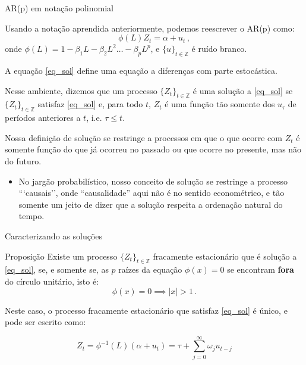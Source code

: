 \documentclass[11pt]{beamer}
\newenvironment{wideitemize}{\itemize\addtolength{\itemsep}{10pt}}{\enditemize}
\newenvironment{halfwideitemize}{\itemize\addtolength{\itemsep}{0.5em}}{\enditemize}
\begin{document}
	\begin{frame}{AR(p) em notação polinomial}
	\begin{wideitemize}
	\item Usando a notação aprendida anteriormente, podemos reescrever o AR(p) como:
	\begin{equation}
		\label{eq_sol}
		\phi(L)Z_t = \alpha + u_t \, , 
	\end{equation}
	onde $\phi(L) = 1 - \beta_1L - \beta_2 L^2 \ldots - \beta_p L^p$, e $\{u\}_{t \in \mathbb{Z}}$ é ruído branco.
	\item A equação \eqref{eq_sol} define uma equação a diferenças  com parte estocástica.
		\item Nesse ambiente, dizemos que um processo $\{Z_t\}_{t \in \mathbb{Z}}$ é uma {\color{blue}solução} a \eqref{eq_sol} se $\{Z_t\}_{t \in \mathbb{Z}}$ satisfaz \eqref{eq_sol} e, para todo $t$, $Z_t$ é uma função tão somente dos $u_\tau$ de períodos anteriores a $t$, i.e. $\tau \leq t$.
		\begin{halfwideitemize}
			\item Nossa definição de solução se restringe a processos em que o que ocorre com $Z_t$ é somente função do que já ocorreu no passado ou que ocorre no presente, mas não do futuro.
			\begin{itemize}
				\item No jargão probabilístico, nosso conceito de solução se restringe a processo ```causais'', onde ``causalidade'' aqui não é no sentido econométrico, e tão somente um jeito de dizer que a solução respeita a ordenação natural do tempo.
			\end{itemize}
		\end{halfwideitemize}
	\end{wideitemize}
	

		
	
	\end{frame}
	\begin{frame}{Caracterizando as soluções}
			\begin{block}{Proposição}
			Existe um processo $\{Z_t\}_{t \in \mathbb{Z}}$ fracamente estacionário que é solução a \eqref{eq_sol}, se, e somente se, as $p$ raízes da equação $\phi(x) = 0$ se encontram \textbf{fora} do círculo unitário, isto é:
			$$\phi(x) = 0 \implies |x| > 1 \, .$$
			
			Neste caso, o processo fracamente estacionário que satisfaz \eqref{eq_sol} é único, e pode ser escrito como:
			
			$$Z_t = \phi^{-1}(L)(\alpha + u_t) =  \tau + \sum_{j=0}^\infty \omega_j u_{t-j}$$
		\end{block}
	\end{frame}
\end{document}
